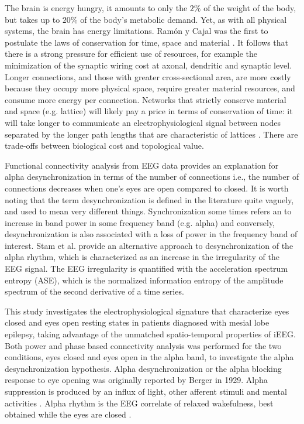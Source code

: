\documentclass[11pt, onecolumn]{article}
\begin{document}
The  brain  is energy  hungry,  it  amounts  to  only the  $2\%$ of the  weight  of the  body,  but  takes  up  to  $20\%$ of the  body's  metabolic demand. Yet, as with all physical systems, the brain has energy limitations. 
Ram{\'o}n y Cajal was the first to postulate the laws of conservation for time, space and material \citep{y1995histology}. 
It follows that there is a strong pressure for efficient use of resources, for example the minimization of the synaptic wiring cost at axonal, dendritic and synaptic level.
Longer connections, and those with greater cross-sectional area, are more costly because they occupy more physical space, require greater material resources, and consume more energy per connection. Networks that strictly conserve material and space (e.g. lattice) will likely pay a price in terms of conservation of time: it will take longer to communicate an electrophysiological signal between nodes separated by the longer path lengths that are characteristic of lattices \citep{fornito2016fundamentals}. There are trade-offs between biological cost and topological value.

Functional connectivity analysis from EEG data provides an explanation for alpha desynchronization in terms of the number of connections i.e., the number of connections decreases when one's eyes are open compared to closed. It is worth noting that the term desynchronization is defined in the literature quite vaguely, and used to mean very different things. Synchronization some times refers an to increase in band power in some frequency band (e.g. alpha) and conversely, desynchronization is also associated with a loss of power in the frequency band of interest. 
Stam et al.\citep{stam1993quantification} provide an alternative approach to desynchronization of the alpha rhythm, which is characterized as an increase in the irregularity of the EEG signal. The EEG irregularity is quantified with the acceleration spectrum entropy (ASE), which is the normalized information entropy of the amplitude spectrum of the second derivative of a time series.

This study investigates the electrophysiological signature that characterize eyes closed and eyes open resting states in patients  diagnosed with mesial lobe epilepsy, taking advantage of the unmatched spatio-temporal properties of iEEG. Both power and phase based connectivity analysis was performed for the two conditions, eyes closed and eyes open in the alpha band, to investigate the alpha desynchronization hypothesis.
Alpha desynchronization or the alpha blocking response to eye opening was originally reported by Berger in 1929. Alpha suppression is produced by an influx of light, other afferent stimuli and mental activities \citep{schomer2012niedermeyer}. Alpha rhythm is the EEG correlate of relaxed wakefulness, best obtained while the eyes are closed  \citep{niedermeyer2005electroencephalography}. 
 
\end{document}
